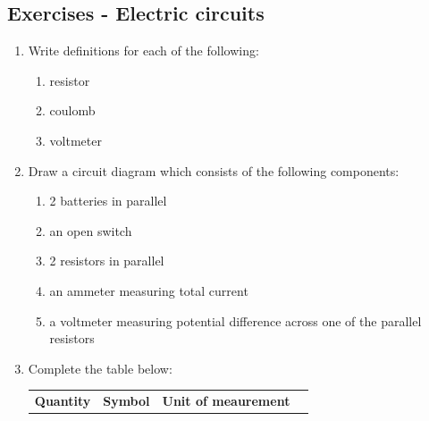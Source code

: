             \subsection{ Exercises - Electric circuits}
            \nopagebreak
      \label{m38776*id68040}\begin{enumerate}[noitemsep, label=\textbf{\arabic*}. ] 
            \label{m38776*uid79}\item  Write definitions for each of the following:
\label{m38776*id68056}\begin{enumerate}[noitemsep, label=\textbf{\alph*}. ] 
            \label{m38776*uid80}\item resistor
\label{m38776*uid81}\item coulomb
\label{m38776*uid82}\item voltmeter
\end{enumerate}
                  \label{m38776*uid83}\item  Draw a circuit diagram which consists of the following components:
\label{m38776*id68109}\begin{enumerate}[noitemsep, label=\textbf{\alph*}. ] 
            \label{m38776*uid84}\item 2 batteries in parallel
\label{m38776*uid85}\item an open switch
\label{m38776*uid86}\item 2 resistors in parallel
\label{m38776*uid87}\item an ammeter measuring total current
\label{m38776*uid88}\item a voltmeter measuring potential difference across one of the parallel resistors
\end{enumerate}
                  \label{m38776*uid89}\item  Complete the table below:
          \begin{table}[H]
        \begin{center}
      \label{m38776*id68187}
    \noindent
      \tablelasttail{}
      \begin{xtabular}[t]{|l|l|l|l|}\hline
        \textbf{Quantity} &
        \textbf{Symbol} &
        \textbf{Unit of meaurement} &

\end{xtabular}
\end{center}
\end{table}
\end{enumerate}
